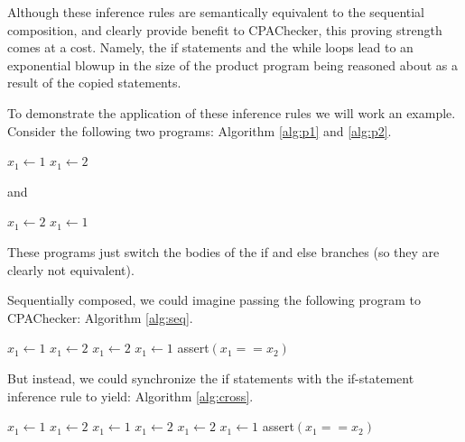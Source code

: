 \documentclass[letterpaper,twocolumn,10pt]{article}
\newcommand{\cross}{\otimes{}}
\begin{document}
Although these inference rules are semantically equivalent to the sequential composition, and clearly provide benefit to CPAChecker, this proving strength comes at a cost. Namely, the if statements and the while loops lead to an exponential blowup in the size of the product program being reasoned about as a result of the copied statements. 

To demonstrate the application of these inference rules we will work an example. Consider the following two programs: Algorithm \ref{alg:p1} and \ref{alg:p2}.

\begin{algorithm}
  \caption{$P1$}
  \label{alg:p1}
  \begin{algorithmic}[1]
        \State $x_1 \gets 1$
    \Else
        \State $x_1 \gets 2$
    \EndIf
  \end{algorithmic}
\end{algorithm}

and

\begin{algorithm}
  \caption{$P1$}
  \label{alg:p2}
  \begin{algorithmic}[1]
        \State $x_1 \gets 2$
    \Else
        \State $x_1 \gets 1$
    \EndIf
  \end{algorithmic}
\end{algorithm}

These programs just switch the bodies of the if and else branches (so they are clearly not equivalent). 

Sequentially composed, we could imagine passing the following program to CPAChecker: Algorithm \ref{alg:seq}.

\begin{algorithm}
  \caption{$P1; P2$}
  \label{alg:seq}
  \begin{algorithmic}[1]
        \State $x_1 \gets 1$
    \Else
        \State $x_1 \gets 2$
    \EndIf
        \State $x_1 \gets 2$
    \Else
        \State $x_1 \gets 1$
    \EndIf
    \State \textsf{assert}$(x_1 == x_2)$
  \end{algorithmic}
\end{algorithm}

But instead, we could synchronize the if statements with the if-statement inference rule to yield: Algorithm \ref{alg:cross}.

\begin{algorithm}
  \caption{$P1{} \cross P2$}
  \label{alg:cross}
  \begin{algorithmic}[1]
        \State $x_1 \gets 1$
            \State $x_1 \gets 2$
        \Else
            \State $x_1 \gets 1$
        \EndIf
    \Else
        \State $x_1 \gets 2$
            \State $x_1 \gets 2$
        \Else
            \State $x_1 \gets 1$
        \EndIf
    \EndIf
    \State \textsf{assert}$(x_1 == x_2)$
  \end{algorithmic}
\end{algorithm}
\end{document}
